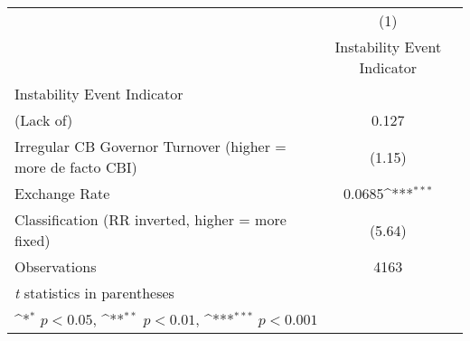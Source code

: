 {
\def\sym#1{\ifmmode^{#1}\else\(^{#1}\)\fi}
\begin{tabular}{l*{1}{c}}
\toprule
                &\multicolumn{1}{c}{(1)}\\
                &\multicolumn{1}{c}{Instability Event Indicator}\\
\midrule
Instability Event Indicator&                  \\
(Lack of)       &    0.127         \\
Irregular CB Governor Turnover (higher = more de facto CBI)&   (1.15)         \\
\addlinespace
Exchange Rate   &   0.0685\sym{***}\\
Classification (RR inverted, higher = more fixed)&   (5.64)         \\
\midrule
Observations    &     4163         \\
\bottomrule
\multicolumn{2}{l}{\footnotesize \textit{t} statistics in parentheses}\\
\multicolumn{2}{l}{\footnotesize \sym{*} \(p<0.05\), \sym{**} \(p<0.01\), \sym{***} \(p<0.001\)}\\
\end{tabular}
}
